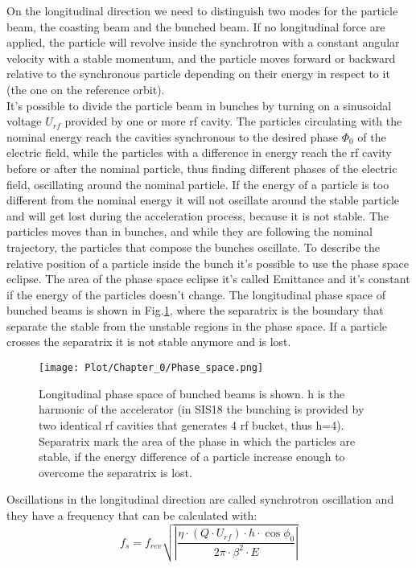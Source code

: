 \documentclass[12pt,a4paper]{report}
\begin{document}
	On the longitudinal direction we need to distinguish two modes for the particle beam, the coasting beam and the bunched beam. If no longitudinal force are applied, the particle will revolve inside the synchrotron with a constant angular velocity with a stable momentum, and the particle moves forward or backward relative to the synchronous particle depending on their energy in respect to it (the one on the reference orbit).\\
	It's possible to divide the particle beam in bunches by turning on a sinusoidal voltage $U_{rf}$ provided by one or more rf cavity. The particles circulating with the nominal energy reach the cavities synchronous to the desired phase $\Phi_0$ of the electric field, while the particles with a difference in energy reach the rf cavity before or after the nominal particle, thus finding different phases of the electric field, oscillating around the nominal particle. If the energy of a particle is too different from the nominal energy it will not oscillate around the stable particle and will get lost during the acceleration process, because it is not stable. The particles moves than in bunches, and while they are following the nominal trajectory, the particles that compose the bunches oscillate. To describe the relative position of a particle inside the bunch it's possible to use the phase space eclipse. The area of the phase space eclipse it's called Emittance and it's constant if the energy of the particles doesn't change. The longitudinal phase space of bunched beams is shown in Fig.\ref{Phase space}, where the separatrix is the boundary that separate the stable from the unstable regions in the phase space. If a particle crosses the separatrix it is not stable anymore and is lost. \\
	\begin{figure} [H]
		\centering
		\texttt{[image: Plot/Chapter\_0/Phase\_space.png]}
		\caption{\small{Longitudinal phase space of bunched beams is shown. h is the harmonic of the accelerator (in SIS18 the bunching is provided by two identical rf cavities that generates 4 rf bucket, thus h=4). Separatrix mark the area of the phase in which the particles are stable, if the energy difference of a particle increase enough to overcome the separatrix is lost.}}
		\label{Phase space}
	\end{figure}
	Oscillations in the longitudinal direction are called synchrotron oscillation and they have a frequency that can be calculated with:
	\begin{equation}
		f_s=f_{rev}\sqrt{|\frac{\eta \cdot (Q \cdot U_{rf}) \cdot h \cdot \cos{\phi_0} }{2 \pi \cdot \beta^2 \cdot E }|}
	\end{equation}
\end{document}

